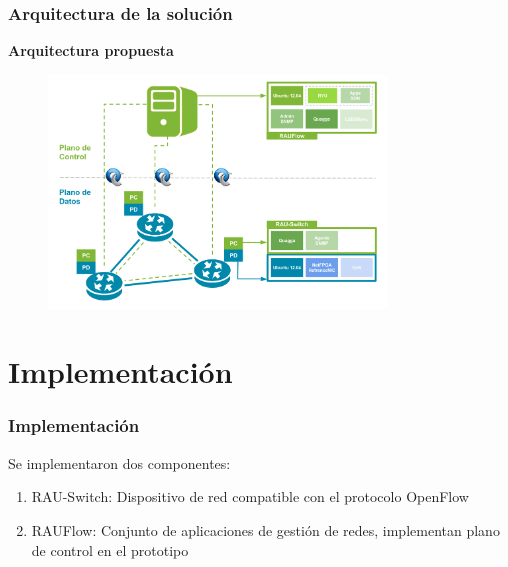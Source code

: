 \documentclass{beamer}
\begin{document}
\begin{frame}
\frametitle{Arquitectura de la soluci\'on} 

\textbf{Arquitectura propuesta} \\

\begin{figure}[H]
\centering
\includegraphics[width=0.80\textwidth]{imagenes/arquitecturapropuesta1.png}
\end{figure}

\end{frame}


\section{Implementaci\'on} 
\frame{\tableofcontents[currentsection]}

\begin{frame}
\frametitle{Implementaci\'on} 

Se implementaron dos componentes:

\begin{enumerate}
\item RAU-Switch: Dispositivo de red compatible con el protocolo OpenFlow
\item RAUFlow: Conjunto de aplicaciones de gesti\'on de redes, implementan plano de control en el prototipo
\end{enumerate}
\end{frame}
\end{document}
